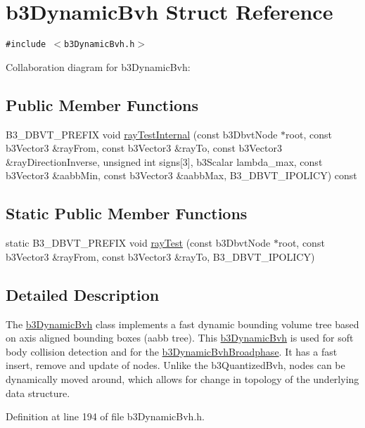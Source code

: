 \hypertarget{structb3_dynamic_bvh}{
\section{b3DynamicBvh Struct Reference}
\label{structb3_dynamic_bvh}
}
{\tt \#include $<$b3DynamicBvh.h$>$}

Collaboration diagram for b3DynamicBvh:\subsection*{Public Member Functions}
\begin{CompactItemize}
\item 
B3\_\-DBVT\_\-PREFIX void \hyperlink{structb3_dynamic_bvh_164303efd5eac767e608b09526734b59}{rayTestInternal} (const b3DbvtNode $\ast$root, const b3Vector3 \&rayFrom, const b3Vector3 \&rayTo, const b3Vector3 \&rayDirectionInverse, unsigned int signs\mbox{[}3\mbox{]}, b3Scalar lambda\_\-max, const b3Vector3 \&aabbMin, const b3Vector3 \&aabbMax, B3\_\-DBVT\_\-IPOLICY) const 
\end{CompactItemize}
\subsection*{Static Public Member Functions}
\begin{CompactItemize}
\item 
static B3\_\-DBVT\_\-PREFIX void \hyperlink{structb3_dynamic_bvh_b913761020aef36751217a877fcf7e6d}{rayTest} (const b3DbvtNode $\ast$root, const b3Vector3 \&rayFrom, const b3Vector3 \&rayTo, B3\_\-DBVT\_\-IPOLICY)
\end{CompactItemize}


\subsection{Detailed Description}
The \hyperlink{structb3_dynamic_bvh}{b3DynamicBvh} class implements a fast dynamic bounding volume tree based on axis aligned bounding boxes (aabb tree). This \hyperlink{structb3_dynamic_bvh}{b3DynamicBvh} is used for soft body collision detection and for the \hyperlink{structb3_dynamic_bvh_broadphase}{b3DynamicBvhBroadphase}. It has a fast insert, remove and update of nodes. Unlike the b3QuantizedBvh, nodes can be dynamically moved around, which allows for change in topology of the underlying data structure. 

Definition at line 194 of file b3DynamicBvh.h.

